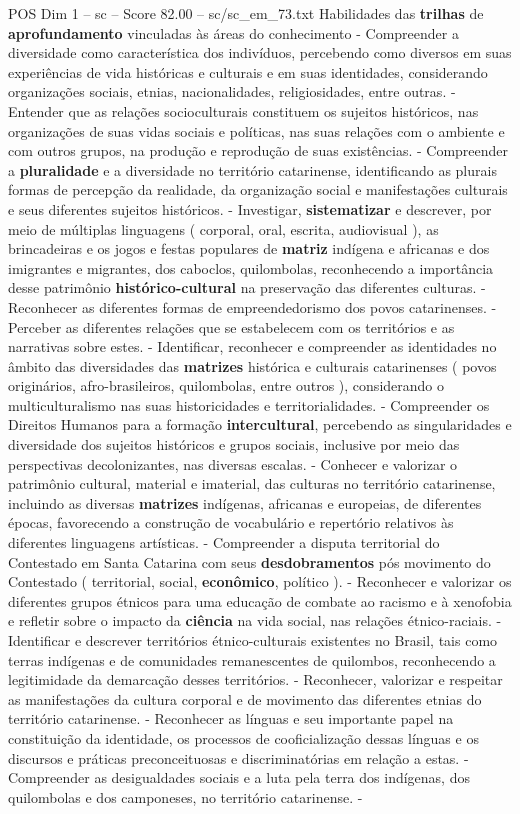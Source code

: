 \begin{textsample}{POS Dim 1 – sc – Score 82.00 – sc/sc\_em\_73.txt}
Habilidades das \textbf{trilhas} de \textbf{aprofundamento} vinculadas às áreas do conhecimento - Compreender a diversidade como característica dos indivíduos, percebendo como diversos em suas experiências de vida históricas e culturais e em suas identidades, considerando organizações sociais, etnias, nacionalidades, religiosidades, entre outras. - Entender que as relações socioculturais constituem os sujeitos históricos, nas organizações de suas vidas sociais e políticas, nas suas relações com o ambiente e com outros grupos, na produção e reprodução de suas existências. - Compreender a \textbf{pluralidade} e a diversidade no território catarinense, identificando as plurais formas de percepção da realidade, da organização social e manifestações culturais e seus diferentes sujeitos históricos. - Investigar, \textbf{sistematizar} e descrever, por meio de múltiplas linguagens ( corporal, oral, escrita, audiovisual ), as brincadeiras e os jogos e festas populares de \textbf{matriz} indígena e africanas e dos imigrantes e migrantes, dos caboclos, quilombolas, reconhecendo a importância desse patrimônio \textbf{histórico-cultural} na preservação das diferentes culturas. - Reconhecer as diferentes formas de empreendedorismo dos povos catarinenses. - Perceber as diferentes relações que se estabelecem com os territórios e as narrativas sobre estes. - Identificar, reconhecer e compreender as identidades no âmbito das diversidades das \textbf{matrizes} histórica e culturais catarinenses ( povos originários, afro-brasileiros, quilombolas, entre outros ), considerando o multiculturalismo nas suas historicidades e territorialidades. - Compreender os Direitos Humanos para a formação \textbf{intercultural}, percebendo as singularidades e diversidade dos sujeitos históricos e grupos sociais, inclusive por meio das perspectivas decolonizantes, nas diversas escalas. - Conhecer e valorizar o patrimônio cultural, material e imaterial, das culturas no território catarinense, incluindo as diversas \textbf{matrizes} indígenas, africanas e europeias, de diferentes épocas, favorecendo a construção de vocabulário e repertório relativos às diferentes linguagens artísticas. - Compreender a disputa territorial do Contestado em Santa Catarina com seus \textbf{desdobramentos} pós movimento do Contestado ( territorial, social, \textbf{econômico}, político ). - Reconhecer e valorizar os diferentes grupos étnicos para uma educação de combate ao racismo e à xenofobia e refletir sobre o impacto da \textbf{ciência} na vida social, nas relações étnico-raciais. - Identificar e descrever territórios étnico-culturais existentes no Brasil, tais como terras indígenas e de comunidades remanescentes de quilombos, reconhecendo a legitimidade da demarcação desses territórios. - Reconhecer, valorizar e respeitar as manifestações da cultura corporal e de movimento das diferentes etnias do território catarinense. - Reconhecer as línguas e seu importante papel na constituição da identidade, os processos de cooficialização dessas línguas e os discursos e práticas preconceituosas e discriminatórias em relação a estas. - Compreender as desigualdades sociais e a luta pela terra dos indígenas, dos quilombolas e dos camponeses, no território catarinense. - 
\end{textsample}
